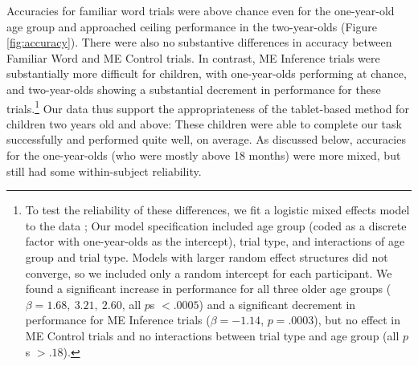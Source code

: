 \documentclass[man,noapacite]{apa2}
\begin{document}
Accuracies for familiar word trials were above chance even for the one-year-old age group and approached ceiling performance in the two-year-olds (Figure \ref{fig:accuracy}). There were also no substantive differences in accuracy between Familiar Word and ME Control trials. In contrast, ME Inference trials were substantially more difficult for children, with one-year-olds performing at chance, and two-year-olds showing a substantial decrement in performance for these trials.\footnote{To test the reliability of these differences, we fit a logistic mixed effects model to the data \cite{jaeger2008}; Our model specification included age group (coded as a discrete factor with one-year-olds as the intercept), trial type, and interactions of age group and trial type. Models with larger random effect structures did not converge, so we included only a random intercept for each participant. We found a significant increase in performance for all three older age groups ($\beta = 1.68,~3.21,~2.60$, all $p$s $< .0005$) and a significant decrement in performance for ME Inference trials  ($\beta = -1.14$, $p = .0003$), but no effect in ME Control trials and no interactions between trial type and age group (all $p$s $> .18$). 
} 
Our data thus support the appropriateness of the tablet-based method for children two years old and above: These children were able to complete our task successfully and performed quite well, on average. As discussed below, accuracies for the one-year-olds (who were mostly above 18 months) were more mixed, but still had some within-subject reliability.

\end{document}
